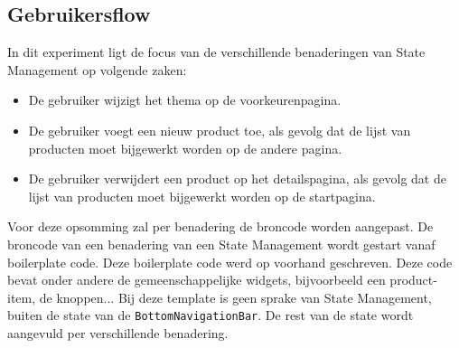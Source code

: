 \subsection{Gebruikersflow}
\label{ch:user-flow}
In dit experiment ligt de focus van de verschillende benaderingen van State Management op volgende zaken: 
\begin{itemize}
    \item De gebruiker wijzigt het thema op de voorkeurenpagina.
    \item De gebruiker voegt een nieuw product toe, als gevolg dat de lijst van producten moet bijgewerkt worden op de andere pagina.
    \item De gebruiker verwijdert een product op het detailspagina, als gevolg dat de lijst van producten moet bijgewerkt worden op de startpagina.
\end{itemize}
Voor deze opsomming zal per benadering de broncode worden aangepast. De broncode van een benadering van een State Management wordt gestart vanaf boilerplate code. Deze boilerplate code werd op voorhand geschreven. Deze code bevat onder andere de gemeenschappelijke widgets, bijvoorbeeld een product-item, de knoppen...
Bij deze template is geen sprake van State Management, buiten de state van de \verb|BottomNavigationBar|. De rest van de state wordt aangevuld per verschillende benadering.

